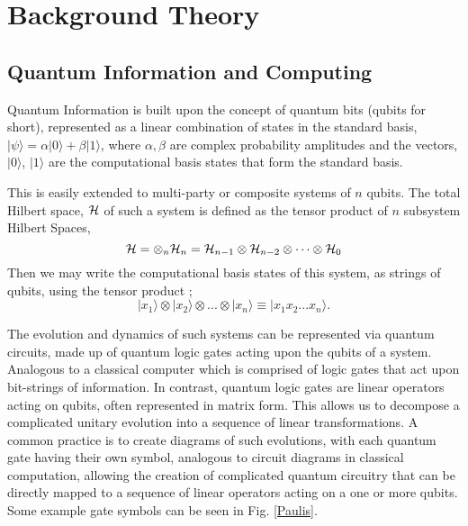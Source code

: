 \section{Background Theory}
\subsection{Quantum Information and Computing}
\vspace{-0.15in}
Quantum Information is built upon the concept of quantum bits (qubits for short), represented as a linear
combination of states in the standard basis,
$|\psi\rangle = \alpha |0\rangle + \beta |1\rangle$, where $\alpha, \beta$ are complex probability amplitudes
and the vectors, $|0\rangle$, $|1\rangle$ are the computational basis states that form the standard basis.

This is easily extended to multi-party or composite systems of $n$ qubits. The total Hilbert space, $\cal{H}$ of
such a system is defined as the tensor product of $n$ subsystem Hilbert Spaces,
\begin{equation}
    {\cal{H}} = \otimes_n {\cal{H}}_n = {\cal{H}}_{n-1} \otimes {\cal{H}}_{n-2} \otimes \dots \otimes {\cal{H}}_0
\end{equation}
Then we may write the computational basis states of this system, as strings of qubits, using the tensor product \cite{schumacher_westmoreland_2010};
\[|x_1\rangle \otimes |x_2\rangle \otimes ... \otimes |x_n\rangle \equiv |x_1 x_2... x_n \rangle. \]

The evolution and dynamics of such systems can be represented via quantum circuits, made up of quantum logic gates acting
upon the qubits of a system. Analogous to a classical computer which is comprised of logic gates that act upon
bit-strings of information. In contrast, quantum logic gates are linear operators acting
on qubits, often represented in matrix form. This allows us to decompose a complicated unitary evolution into a
sequence of linear transformations. A common practice is to create
diagrams of such evolutions, with each quantum gate having their own symbol, analogous to circuit diagrams in classical
computation, allowing the creation of complicated quantum circuitry that can be directly mapped to a sequence of linear
operators acting on a one or more qubits. Some example gate symbols can be seen in Fig. \ref{Paulis}.




